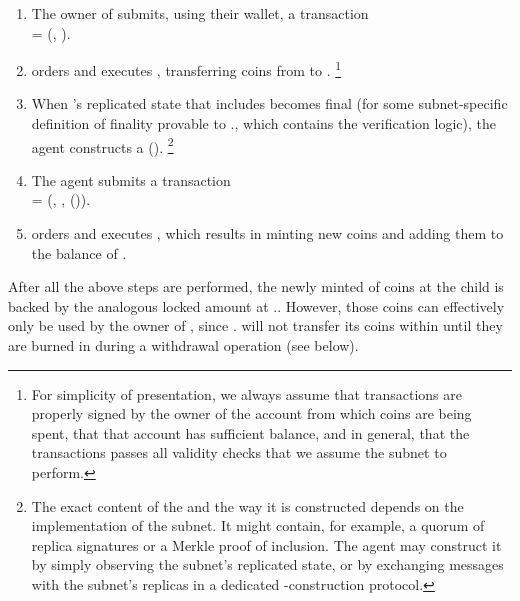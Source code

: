\begin{enumerate}

    \item The owner of  submits, using their wallet, a transaction\\
     = (, ).
    
    \item {} orders and executes , transferring  coins from  to .%
    \footnote{For simplicity of presentation, we always assume that transactions are properly signed by the owner of the account from which coins are being spent,
    that that account has sufficient balance, and in general, that the transactions passes all validity checks that we assume the subnet to perform.}
    
    \item When 's replicated state that includes  becomes final (for some subnet-specific definition of finality provable to .\gw, which contains the \pof verification logic),
    the \ipc agent constructs a {\pof}().%
    \footnote{The exact content of the \pof and the way it is constructed depends on the implementation of the subnet.
    It might contain, for example, a quorum of replica signatures or a Merkle proof of inclusion.
    The \ipc agent may construct it by simply observing the subnet's replicated state, or by exchanging messages with the subnet's replicas in a dedicated \pof-construction protocol.}
    
    \item The \ipc agent submits a transaction\\
     = (, , {\pof}()).
    
    \item {} orders and executes , which results in minting  new coins and adding them to the balance of .
    
\end{enumerate}

After all the above steps are performed, the newly minted  of coins at the child is backed by the analogous locked amount at ..
However, those coins can effectively only be used by the owner of ,
since . will not transfer its coins within  until they are burned in  during a withdrawal operation (see below).

